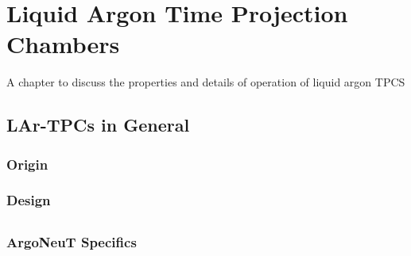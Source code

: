 \chapter{Liquid Argon Time Projection Chambers}

A chapter to discuss the properties and details of operation of liquid argon TPCS

\xspace

\section{LAr-TPCs in General}

\subsection{Origin}

\subsection{Design}

\section{\argoneut}

\subsection{ArgoNeuT Specifics}
